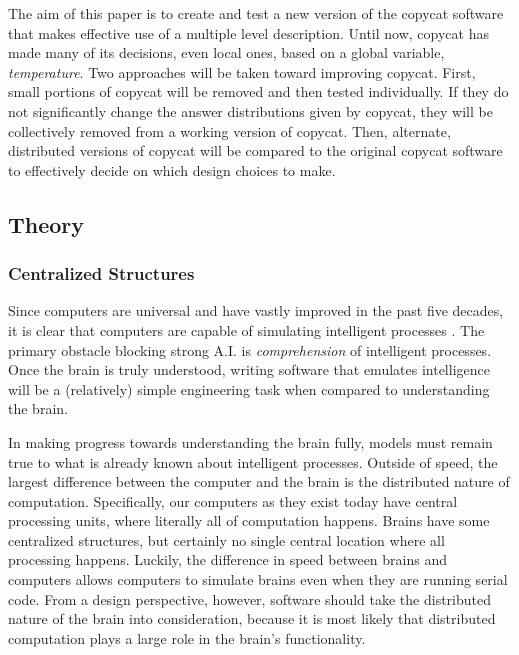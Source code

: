 \documentclass[a4paper]{article}
\begin{document}
    The aim of this paper is to create and test a new version of the copycat software that makes effective use of a multiple level description.
    Until now, copycat has made many of its decisions, even local ones, based on a global variable, \emph{temperature}.
    Two approaches will be taken toward improving copycat.
    First, small portions of copycat will be removed and then tested individually.
    If they do not significantly change the answer distributions given by copycat, they will be collectively removed from a working version of copycat.
    Then, alternate, distributed versions of copycat will be compared to the original copycat software to effectively decide on which design choices to make.

\subsection{Theory}

    \subsubsection{Centralized Structures}

    Since computers are universal and have vastly improved in the past five decades, it is clear that computers are capable of simulating intelligent processes \cite{computerandthebrain}.
    The primary obstacle blocking strong A.I. is \emph{comprehension} of intelligent processes. 
    Once the brain is truly understood, writing software that emulates intelligence will be a (relatively) simple engineering task when compared to understanding the brain. 

    In making progress towards understanding the brain fully, models must remain true to what is already known about intelligent processes.
    Outside of speed, the largest difference between the computer and the brain is the distributed nature of computation. 
    Specifically, our computers as they exist today have central processing units, where literally all of computation happens. 
    Brains have some centralized structures, but certainly no single central location where all processing happens. 
    Luckily, the difference in speed between brains and computers allows computers to simulate brains even when they are running serial code.
    From a design perspective, however, software should take the distributed nature of the brain into consideration, because it is most likely that distributed computation plays a large role in the brain's functionality.
\end{document}
